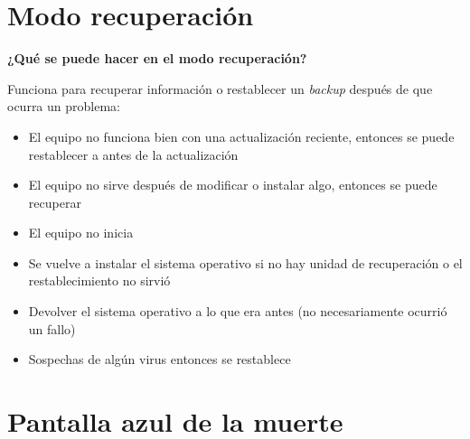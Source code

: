\documentclass[stu, 12pt, letterpaper, donotrepeattitle, floatsintext, natbib, helv]{apa7}
\begin{document}
\section*{Modo recuperación}
{}

\textbf{¿Qué se puede hacer en el modo recuperación?}

Funciona para recuperar información o restablecer un \textit{backup} después de que ocurra un problema:
\begin{itemize}
    \item El equipo no funciona bien con una actualización reciente, entonces se puede restablecer a antes de la actualización
    \item El equipo no sirve después de modificar o instalar algo, entonces se puede recuperar
    \item El equipo no inicia
    \item Se vuelve a instalar el sistema operativo si no hay unidad de recuperación o el restablecimiento no sirvió
    \item Devolver el sistema operativo a lo que era antes (no necesariamente ocurrió un fallo)
    \item Sospechas de algún virus entonces se restablece
\end{itemize}

\section*{Pantalla azul de la muerte}
{}
\end{document}
